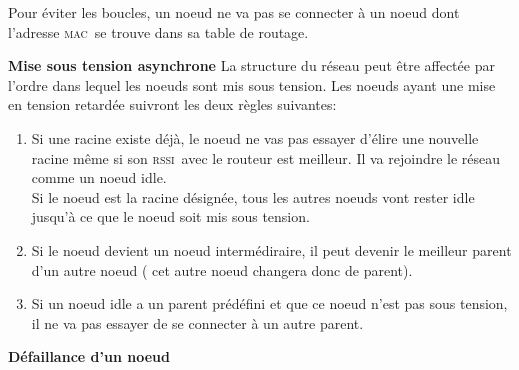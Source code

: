\documentclass[a4paper, 12pt]{report}
\newcommand{\mac}{\textsc{mac}}
\newcommand{\rssi}{\textsc{rssi}}
\begin{document}
        Pour éviter les boucles, un noeud ne va pas se connecter à un noeud dont l'adresse \mac\ se trouve dans sa table de routage.
        \vspace{0.5cm}

        \textbf{Mise sous tension asynchrone}\newline
            La structure du réseau peut être affectée par l'ordre dans lequel les noeuds sont mis sous tension.
            Les noeuds ayant une mise en tension retardée suivront les deux règles suivantes:
            \begin{enumerate}
                \item Si une racine existe déjà, le noeud ne vas pas essayer d'élire une nouvelle racine
                    même si son \rssi\ avec le routeur est meilleur. Il va rejoindre le réseau comme un noeud idle. \\
                    Si le noeud est la racine désignée, tous les autres noeuds vont rester idle
                    jusqu'à ce que le noeud soit mis sous tension.
                \item Si le noeud devient un noeud intermédiraire, il peut devenir le meilleur parent d'un autre noeud ( cet autre noeud changera donc de parent).
                \item Si un noeud idle a un parent prédéfini et que ce noeud n'est pas sous tension, il ne va pas essayer de se connecter à un autre parent.
            \end{enumerate}
        \vspace{0.5cm}
        \textbf{Défaillance d'un noeud}\newline
\end{document}
